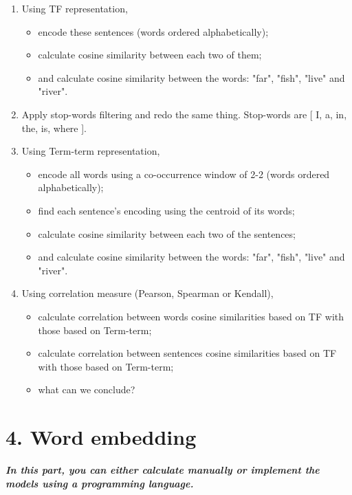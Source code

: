 \documentclass[11pt, a4paper]{article}
\begin{document}
\begin{enumerate}
	\item Using TF representation, 
	\begin{itemize}
		\item encode these sentences (words ordered alphabetically);
		\item calculate cosine similarity between each two of them;
		\item and calculate cosine similarity between the words: "far", "fish", "live" and "river".
	\end{itemize}

	\item Apply stop-words filtering and redo the same thing. Stop-words are [ I, a, in, the, is, where ].
	
	\item Using Term-term representation, 
	\begin{itemize}
		\item encode all words using a co-occurrence window of 2-2 (words ordered alphabetically);
		\item find each sentence's encoding using the centroid of its words;
		\item calculate cosine similarity between each two of the sentences;
		\item and calculate cosine similarity between the words: "far", "fish", "live" and "river".
	\end{itemize}

	\item Using correlation measure (Pearson, Spearman or Kendall), 
	\begin{itemize}
		\item calculate correlation between words cosine similarities based on TF with those based on Term-term;
		\item calculate correlation between sentences cosine similarities based on TF with those based on Term-term;
		\item what can we conclude?
	\end{itemize}
	
\end{enumerate}

\section*{4. Word embedding}

\textbf{\textit{In this part, you can either calculate manually or implement the models using a programming language.}}
\end{document}
